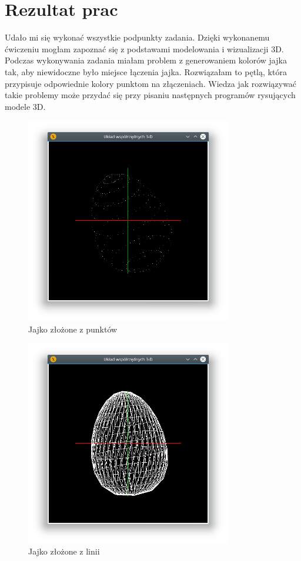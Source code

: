 \documentclass[12pt,a4paper,titlepage]{article}
\begin{document}
\section{Rezultat prac}
Udało mi się wykonać wszystkie podpunkty zadania. Dzięki wykonanemu ćwiczeniu mogłam zapoznać się z podstawami modelowania i wizualizacji 3D. Podczas wykonywania zadania miałam problem z generowaniem kolorów jajka tak, aby niewidoczne było miejsce łączenia jajka. Rozwiązałam to pętlą, która przypisuje odpowiednie kolory punktom na złączeniach. Wiedza jak rozwiązywać takie problemy może przydać się przy pisaniu następnych programów rysujących modele 3D.

\begin{figure}[H]
\centering
\includegraphics[width = 9cm]{images/egg_points.png}
\caption{Jajko złożone z punktów}
\label{fig:eggPoints}
\end{figure}

\begin{figure}[H]
\centering
\includegraphics[width = 9cm]{images/egg_lines.png}
\caption{Jajko złożone z linii}
\label{fig:eggLines}
\end{figure}
\end{document}
